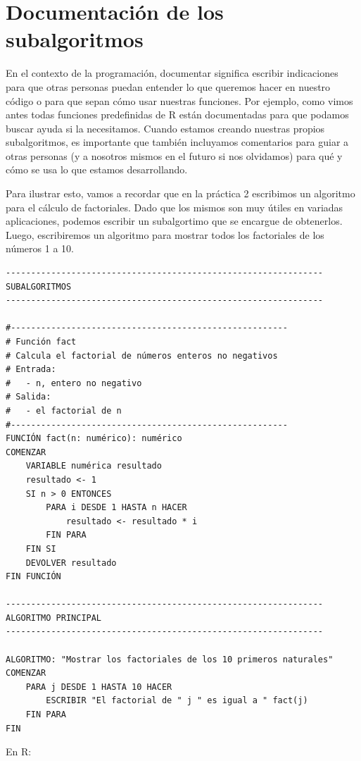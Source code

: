 \documentclass[
]{book}
\begin{document}
\hypertarget{documentaciuxf3n-de-los-subalgoritmos}{%
\section{Documentación de los subalgoritmos}\label{documentaciuxf3n-de-los-subalgoritmos}}

En el contexto de la programación, documentar significa escribir indicaciones para que otras personas puedan entender lo que queremos hacer en nuestro código o para que sepan cómo usar nuestras funciones. Por ejemplo, como vimos antes todas funciones predefinidas de R están documentadas para que podamos buscar ayuda si la necesitamos. Cuando estamos creando nuestras propios subalgoritmos, es importante que también incluyamos comentarios para guiar a otras personas (y a nosotros mismos en el futuro si nos olvidamos) para qué y cómo se usa lo que estamos desarrollando.

Para ilustrar esto, vamos a recordar que en la práctica 2 escribimos un algoritmo para el cálculo de factoriales. Dado que los mismos son muy útiles en variadas aplicaciones, podemos escribir un subalgortimo que se encargue de obtenerlos. Luego, escribiremos un algoritmo para mostrar todos los factoriales de los números 1 a 10.

\begin{verbatim}
---------------------------------------------------------------
SUBALGORITMOS
---------------------------------------------------------------

#-------------------------------------------------------
# Función fact
# Calcula el factorial de números enteros no negativos
# Entrada:
#   - n, entero no negativo
# Salida:
#   - el factorial de n
#-------------------------------------------------------
FUNCIÓN fact(n: numérico): numérico
COMENZAR
    VARIABLE numérica resultado
    resultado <- 1
    SI n > 0 ENTONCES
        PARA i DESDE 1 HASTA n HACER
            resultado <- resultado * i
        FIN PARA
    FIN SI
    DEVOLVER resultado
FIN FUNCIÓN

---------------------------------------------------------------
ALGORITMO PRINCIPAL
---------------------------------------------------------------

ALGORITMO: "Mostrar los factoriales de los 10 primeros naturales"
COMENZAR
    PARA j DESDE 1 HASTA 10 HACER
        ESCRIBIR "El factorial de " j " es igual a " fact(j)
    FIN PARA
FIN
\end{verbatim}

En R:
\end{document}
